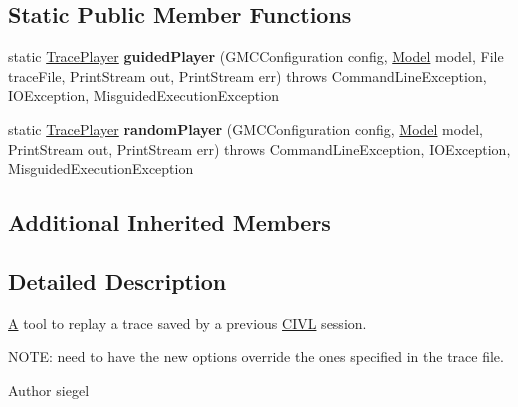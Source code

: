 \subsection*{Static Public Member Functions}
\begin{DoxyCompactItemize}
\item 
\hypertarget{classedu_1_1udel_1_1cis_1_1vsl_1_1civl_1_1run_1_1IF_1_1TracePlayer_ad9c748729bfbb77e7631a5b054fab23a}{}static \hyperlink{classedu_1_1udel_1_1cis_1_1vsl_1_1civl_1_1run_1_1IF_1_1TracePlayer}{Trace\+Player} {\bfseries guided\+Player} (G\+M\+C\+Configuration config, \hyperlink{interfaceedu_1_1udel_1_1cis_1_1vsl_1_1civl_1_1model_1_1IF_1_1Model}{Model} model, File trace\+File, Print\+Stream out, Print\+Stream err)  throws Command\+Line\+Exception, I\+O\+Exception, 			\+Misguided\+Execution\+Exception \label{classedu_1_1udel_1_1cis_1_1vsl_1_1civl_1_1run_1_1IF_1_1TracePlayer_ad9c748729bfbb77e7631a5b054fab23a}

\item 
\hypertarget{classedu_1_1udel_1_1cis_1_1vsl_1_1civl_1_1run_1_1IF_1_1TracePlayer_acd5af4c1a012c430fe988b9ec9c1e253}{}static \hyperlink{classedu_1_1udel_1_1cis_1_1vsl_1_1civl_1_1run_1_1IF_1_1TracePlayer}{Trace\+Player} {\bfseries random\+Player} (G\+M\+C\+Configuration config, \hyperlink{interfaceedu_1_1udel_1_1cis_1_1vsl_1_1civl_1_1model_1_1IF_1_1Model}{Model} model, Print\+Stream out, Print\+Stream err)  throws Command\+Line\+Exception, I\+O\+Exception, 			\+Misguided\+Execution\+Exception \label{classedu_1_1udel_1_1cis_1_1vsl_1_1civl_1_1run_1_1IF_1_1TracePlayer_acd5af4c1a012c430fe988b9ec9c1e253}

\end{DoxyCompactItemize}
\subsection*{Additional Inherited Members}


\subsection{Detailed Description}
\hyperlink{structA}{A} tool to replay a trace saved by a previous \hyperlink{classedu_1_1udel_1_1cis_1_1vsl_1_1civl_1_1CIVL}{C\+I\+V\+L} session. 

N\+O\+T\+E\+: need to have the new options override the ones specified in the trace file.

\begin{DoxyAuthor}{Author}
siegel 
\end{DoxyAuthor}



